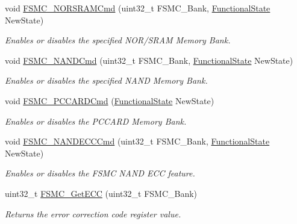 \begin{DoxyCompactItemize}
void \hyperlink{group___f_s_m_c___exported___functions_gaf943f0f2680168d3a95a3c2c9f3eca2a}{F\+S\+M\+C\+\_\+\+N\+O\+R\+S\+R\+A\+M\+Cmd} (uint32\+\_\+t F\+S\+M\+C\+\_\+\+Bank, \hyperlink{group___exported__types_gac9a7e9a35d2513ec15c3b537aaa4fba1}{Functional\+State} New\+State)
\begin{DoxyCompactList}\small\item\em Enables or disables the specified N\+O\+R/\+S\+R\+AM Memory Bank. \end{DoxyCompactList}\item 
void \hyperlink{group___f_s_m_c___exported___functions_ga33ec7c39ea4d42e92c72c6e517d8235c}{F\+S\+M\+C\+\_\+\+N\+A\+N\+D\+Cmd} (uint32\+\_\+t F\+S\+M\+C\+\_\+\+Bank, \hyperlink{group___exported__types_gac9a7e9a35d2513ec15c3b537aaa4fba1}{Functional\+State} New\+State)
\begin{DoxyCompactList}\small\item\em Enables or disables the specified N\+A\+ND Memory Bank. \end{DoxyCompactList}\item 
void \hyperlink{group___f_s_m_c___exported___functions_ga2d410151ceb3428c6a1bf374a0472cde}{F\+S\+M\+C\+\_\+\+P\+C\+C\+A\+R\+D\+Cmd} (\hyperlink{group___exported__types_gac9a7e9a35d2513ec15c3b537aaa4fba1}{Functional\+State} New\+State)
\begin{DoxyCompactList}\small\item\em Enables or disables the P\+C\+C\+A\+RD Memory Bank. \end{DoxyCompactList}\item 
void \hyperlink{group___f_s_m_c___exported___functions_ga5800301fc39bbe998a18ebd9ff191cdc}{F\+S\+M\+C\+\_\+\+N\+A\+N\+D\+E\+C\+C\+Cmd} (uint32\+\_\+t F\+S\+M\+C\+\_\+\+Bank, \hyperlink{group___exported__types_gac9a7e9a35d2513ec15c3b537aaa4fba1}{Functional\+State} New\+State)
\begin{DoxyCompactList}\small\item\em Enables or disables the F\+S\+MC N\+A\+ND E\+CC feature. \end{DoxyCompactList}\item 
uint32\+\_\+t \hyperlink{group___f_s_m_c___exported___functions_gaad6d4f5b5a41684ce053fea55bdb98d8}{F\+S\+M\+C\+\_\+\+Get\+E\+CC} (uint32\+\_\+t F\+S\+M\+C\+\_\+\+Bank)
\begin{DoxyCompactList}\small\item\em Returns the error correction code register value. \end{DoxyCompactList}\item 

\end{DoxyCompactItemize}
